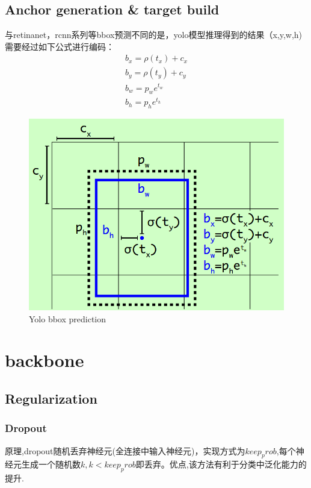 \documentclass{article}
\begin{document}
\subsection{Anchor generation \& target build}
与retinanet，rcnn系列等bbox预测不同的是，yolo模型推理得到的结果（x,y,w,h)需要经过如下公式进行编码：
\begin{equation}
\begin{aligned}
b_x = \rho(t_x)+c_x \\
b_y = \rho(t_y)+c_y \\
b_w = p_we^{t_w} \\
b_h = p_he^{t_h}
\end{aligned}
\end{equation}
\begin{figure}[htp!]
\centering
\includegraphics[scale=0.3]{images/yolo_bbox.png}
\caption{Yolo bbox prediction}
\end{figure}

\section{backbone}
\subsection{Regularization}
\subsubsection{Dropout}
原理,dropout随机丢弃神经元(全连接中输入神经元)，实现方式为$keep_prob$,每个神经元生成一个随机数$k,k<keep_prob$即丢弃。优点,该方法有利于分类中泛化能力的提升.
\end{document}
